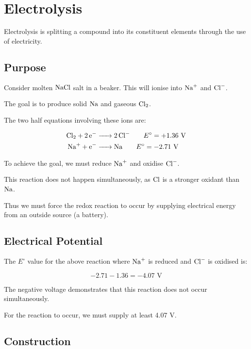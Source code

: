 \documentclass[a4paper,11pt]{article}
\begin{document}
\section{Electrolysis}

Electrolysis is splitting a compound into its constituent elements through the
use of electricity.

\subsection{Purpose}

Consider molten $\ce{NaCl}$ salt in a beaker. This will ionise into $\ce{Na+}$
and $\ce{Cl-}$.

The goal is to produce solid $\ce{Na}$ and gaseous $\ce{Cl2}$.

The two half equations involving these ions are:

$$
\begin{aligned}
\ce{Cl2 + 2e- & -> 2Cl-} \qquad E^\circ = +1.36\text{ V} \\
\ce{Na+ + e- & -> Na} \qquad E^\circ = -2.71\text{ V} \\
\end{aligned}
$$

To achieve the goal, we must reduce $\ce{Na+}$ and oxidise $\ce{Cl-}$.

This reaction does not happen simultaneously, as $\ce{Cl}$ is a stronger
oxidant than $\ce{Na}$.

Thus we must force the redox reaction to occur by supplying electrical energy
from an outside source (a battery).

\subsection{Electrical Potential}

The $E^\circ$ value for the above reaction where $\ce{Na+}$ is reduced and
$\ce{Cl-}$ is oxidised is:

$$
-2.71 - 1.36 = -4.07\text{ V}
$$

The negative voltage demonstrates that this reaction does not occur
simultaneously.

For the reaction to occur, we must supply at least 4.07 V.

\subsection{Construction}

\end{document}
